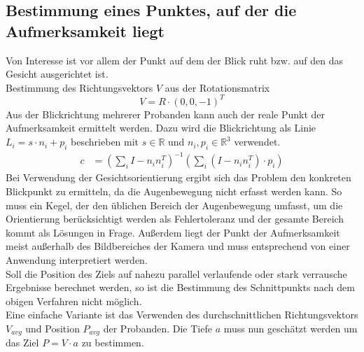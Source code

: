 \subsection{Bestimmung eines Punktes, auf der die Aufmerksamkeit liegt}
Von Interesse ist vor allem der Punkt auf dem der Blick ruht bzw. auf den das Gesicht ausgerichtet ist.\\
Bestimmung des Richtungsvektors $V$ aus der Rotationsmatrix
\[V= R\cdot (0,0,-1)^T\] 
Aus der Blickrichtung mehrerer Probanden kann auch der reale Punkt der Aufmerksamkeit ermittelt werden. Dazu wird die Blickrichtung als Linie $L_i = s \cdot n_i+ p_i$ beschrieben mit $s\in \mathbb{R}$ und $n_i,p_i \in \mathbb{R}^3$ verwendet.
\begin{align*}
c&=(\sum_{i} I -n_in_i^T)^{-1}
(\sum_{i} (I -n_in_i^T)\cdot p_i)
\end{align*}
Bei Verwendung der Gesichtsorientierung ergibt sich das Problem den konkreten Blickpunkt zu ermitteln, da die Augenbewegung nicht erfasst werden kann.
So muss ein Kegel, der den üblichen Bereich der Augenbewegung umfasst, um die Orientierung berücksichtigt werden als Fehlertoleranz und der gesamte Bereich kommt als Lösungen in Frage.
Außerdem liegt der Punkt der Aufmerksamkeit meist außerhalb des Bildbereiches der Kamera und muss entsprechend von einer Anwendung interpretiert werden.\\
Soll die Position des Ziels auf nahezu parallel verlaufende oder stark verrausche Ergebnisse berechnet werden, so ist die Bestimmung des Schnittpunkts nach dem obigen Verfahren nicht möglich.\\
Eine einfache Variante ist das Verwenden des durchschnittlichen Richtungsvektors $V_{avg}$ und Position $P_{avg}$ der Probanden. Die Tiefe $a$ muss nun geschätzt werden um das Ziel $P=V\cdot a$ zu bestimmen.